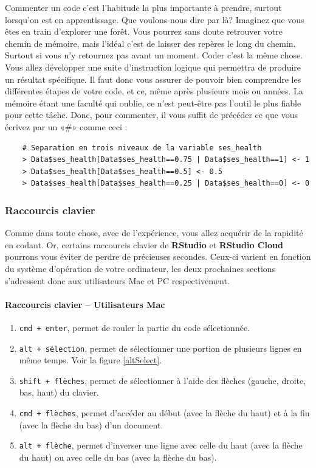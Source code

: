 \documentclass[10.5pt,a4paper]{article}
\begin{document}
    Commenter un code c'est l'habitude la plus importante à prendre, surtout lorsqu'on est en apprentissage. Que voulons-nous dire par là? Imaginez que vous êtes en train d'explorer une forêt. Vous pourrez sans doute retrouver votre chemin de mémoire, mais l'idéal c'est de laisser des repères le long du chemin. Surtout si vous n'y retournez pas avant un moment. Coder c'est la même chose. Vous allez développer une suite d'instruction logique qui permettra de produire un résultat spécifique. Il faut donc vous assurer de pouvoir bien comprendre les différentes étapes de votre code, et ce, même après plusieurs mois ou années. La mémoire étant une faculté qui oublie, ce n'est peut-être pas l'outil le plus fiable pour cette tâche. Donc, pour commenter, il vous suffit de précéder ce que vous écrivez par un «$\#$» comme ceci :
    
    \begin{lstlisting}
    # Separation en trois niveaux de la variable ses_health
    > Data$ses_health[Data$ses_health==0.75 | Data$ses_health==1] <- 1 
    > Data$ses_health[Data$ses_health==0.5] <- 0.5
    > Data$ses_health[Data$ses_health==0.25 | Data$ses_health==0] <- 0
    \end{lstlisting}
    
    \subsubsection{Raccourcis clavier}
    
    Comme dans toute chose, avec de l'expérience, vous allez acquérir de la rapidité en codant. Or, certains raccourcis clavier de \textbf{RStudio} et \textbf{RStudio Cloud} pourrons vous éviter de perdre de précieuses secondes. Ceux-ci varient en fonction du système d'opération de votre ordinateur, les deux prochaines sections s'adressent donc aux utilisateurs Mac et PC respectivement. 
    
      \paragraph{Raccourcis clavier -- Utilisateurs Mac}
      \begin{enumerate}
        \item \texttt{cmd + enter}, permet de rouler la partie du code sélectionnée.
        \item \texttt{alt + sélection}, permet de sélectionner une portion de plusieurs lignes en même temps. Voir la figure \ref{altSelect}.
        \item \texttt{shift + flèches}, permet de sélectionner à l'aide des flèches (gauche, droite, bas, haut) du clavier.
        \item \texttt{cmd + flèches}, permet d'accéder au début (avec la flèche du haut) et à la fin (avec la flèche du bas) d'un document.
        \item \texttt{alt + flèche}, permet d'inverser une ligne avec celle du haut (avec la flèche du haut) ou avec celle du bas (avec la flèche du bas).
      \end{enumerate}
      
\end{document}
